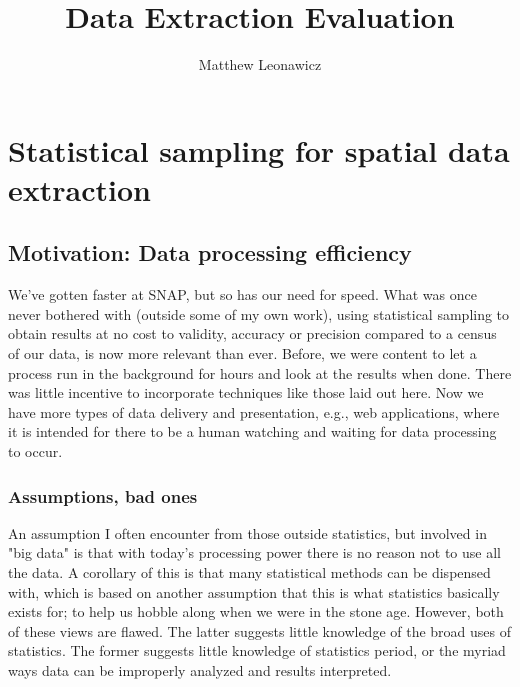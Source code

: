 \documentclass{article}\usepackage[]{graphicx}\usepackage[]{color}
\begin{document}
\title{Data Extraction Evaluation}
\author{Matthew Leonawicz}
\maketitle





\section{Statistical sampling for spatial data extraction}

\subsection{Motivation: Data processing efficiency}

We've gotten faster at SNAP, but so has our need for speed. What was once never bothered with (outside some of my own work),
using statistical sampling to obtain results at no cost to validity, accuracy or precision compared to a census of our data,
is now more relevant than ever.
Before, we were content to let a process run in the background for hours and look at the results when done.
There was little incentive to incorporate techniques like those laid out here.
Now we have more types of data delivery and presentation, e.g., web applications, where it is intended for there to be a human watching and waiting for data processing to occur.

\subsubsection{Assumptions, bad ones}
An assumption I often encounter from those outside statistics, but involved in "big data" is that with today's processing power there is no reason not to use all the data.
A corollary of this is that many statistical methods can be dispensed with,
which is based on another assumption that this is what statistics basically exists for;
to help us hobble along when we were in the stone age.
However, both of these views are flawed.
The latter suggests little knowledge of the broad uses of statistics.
The former suggests little knowledge of statistics period, or the myriad ways data can be improperly analyzed and results interpreted.
\end{document}
